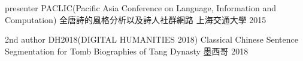 



\begin{cvhonors}

  \cvhonor
    {presenter} %
    {PACLIC(Pacific Asia Conference on Language, Information and
    Computation) 全唐詩的風格分析以及詩人社群網路} %
    {上海交通大學} %
    {2015} %

  \cvhonor
    {2nd author} %
    {DH2018(DIGITAL HUMANITIES 2018) Classical Chinese Sentence Segmentation for Tomb Biographies of Tang Dynasty} %
    {墨西哥} %
    {2018} %

\end{cvhonors}
